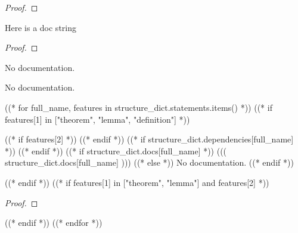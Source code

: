 \begin{proof}
    \leanok
\end{proof}

\begin{theorem}\label{List.Nat.Ex}
        \leanok
                Here is a doc string
    \end{theorem}

\begin{proof}
    \leanok
\end{proof}

\begin{lemma}\label{List.test}
                No documentation.
    \end{lemma}

\begin{theorem}\label{List.Test}
                No documentation.
    \end{theorem}




((* for full_name, features in structure_dict.statements.items() *))
((* if features[1] in ["theorem", "lemma", "definition"] *))
\begin{((( features[1] )))}\label{((( full_name )))}
    ((* if features[2] *))
    \leanok
    ((* endif *))
    ((* if structure_dict.dependencies[full_name] *))
    ((* endif *))
    ((* if structure_dict.docs[full_name] *))
        ((( structure_dict.docs[full_name] )))
    ((* else *))
        No documentation.
    ((* endif *))
\end{((( features[1] )))}

((* endif *))
((* if features[1] in ["theorem", "lemma"] and features[2] *))
\begin{proof}
    \leanok
\end{proof}

((* endif *))
((* endfor *))
